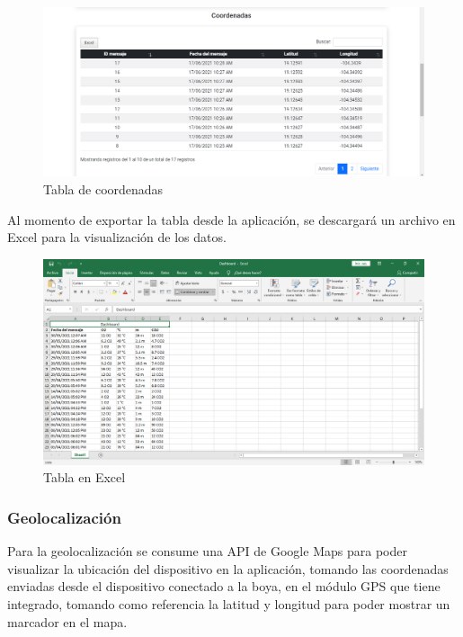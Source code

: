 \documentclass[12pt]{book}
\begin{document}
\begin{figure}[h]
	\centering
	\includegraphics[width=0.8\linewidth]{imagenes/tablaCoordenadas}
	\caption{Tabla de coordenadas}
	\label{fig:Tabla de coordenadas}
\end{figure}

\vspace{5cm}


Al momento de exportar la tabla desde la aplicación, se descargará un archivo en Excel para la visualización de los datos.

\begin{figure}[h!]
	\centering
	\includegraphics[width=0.8\linewidth]{imagenes/excel}
	\caption{Tabla en Excel}
	\label{fig:Tabla en Excel}
\end{figure}

\vspace{5cm}

\subsubsection{Geolocalización}

Para la geolocalización se consume una API de Google Maps para poder visualizar la ubicación del dispositivo en la aplicación, tomando las coordenadas enviadas desde el dispositivo conectado a la boya, en el módulo GPS que tiene integrado, tomando como referencia la latitud y longitud para poder mostrar un marcador en el mapa.
\end{document}
